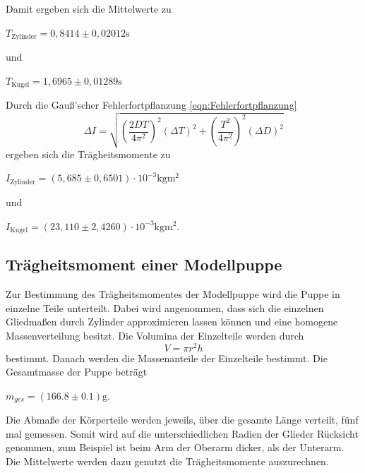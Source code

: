 Damit ergeben sich die Mittelwerte zu 
\begin{center}
  $T_{\text{Zylinder}} = 0,8414 \pm 0,02012 \si{\second} $
\end{center}
und
\begin{center}
  $ T_{\text{Kugel}} = 1,6965 \pm 0,01289 \si{\second} $
\end{center}
Durch die Gauß'scher Fehlerfortpflanzung \ref{eqn:Fehlerfortpflanzung}
\begin{equation}
  \Delta I = \sqrt{ (\frac{2DT}{4\pi^2})^2  (\Delta T)^2 + (\frac{T^2}{4\pi^2})^2 (\Delta D)^2}
  \label{eqn:Fehlerfortpflanzung}
\end{equation}
ergeben sich die Trägheitsmomente zu
\begin{center}
  $ I_{\text{Zylinder}} = (5,685 \pm 0,6501) \cdot 10^{-3} \si{\kilogram\meter^2} $ 
\end{center}
und
\begin{center}
  $ I_{\text{Kugel}} = (23,110 \pm 2,4260) \cdot 10^{-3} \si{\kilogram\meter^2} $.
\end{center}


\subsection{Trägheitsmoment einer Modellpuppe}
\label{sec:Trägheitsmoment einer Modellpuppe}

Zur Bestimmung des Trägheitsmomentes der Modellpuppe wird die Puppe in einzelne Teile unterteilt. Dabei wird angenommen,
dass sich die einzelnen Gliedmaßen durch Zylinder approximieren lassen können und eine homogene Massenverteilung besitzt. Die
Volumina der Einzelteile werden durch
\begin{equation}
  V = \pi r^2h
  \label{eqn:Volumen}
\end{equation}
 bestimmt. Danach werden die Massenanteile der Einzelteile bestimmt. Die Gesamtmasse der Puppe beträgt 
\begin{center}
  $m_{ges} = (166.8\pm 0.1)\si{\gram}$.
\end{center}
Die Abmaße der Körperteile werden jeweils, über die gesamte Länge verteilt, fünf mal gemessen. Somit wird auf die unterschiedlichen
Radien der Glieder Rücksicht genommen, zum Beispiel ist beim Arm der Oberarm dicker, als der Unterarm. Die Mittelwerte werden dazu genutzt die
Trägheitsmomente auszurechnen.

